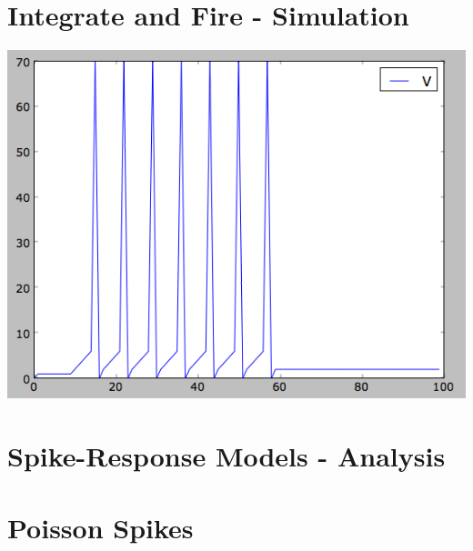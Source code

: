 \documentclass[12pt]{article}
\begin{document}
\section{Integrate and Fire - Simulation}

\includegraphics[scale=0.71]{integratefirespikes.png}

\section{Spike-Response Models - Analysis}



\section{Poisson Spikes}
\end{document}
